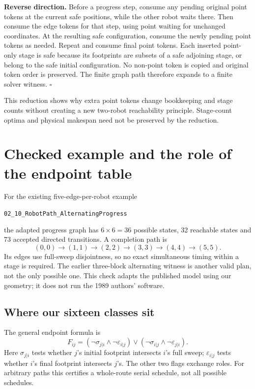 \documentclass[11pt,a4paper]{article}
\begin{document}
\textbf{Reverse direction.} Before a progress step, consume any pending original
point tokens at the current safe positions, while the other robot waits there.
Then consume the edge tokens for that step, using point waiting for unchanged
coordinates. At the resulting safe configuration, consume the newly pending
point tokens as needed. Repeat and consume final point tokens. Each inserted
point-only stage is safe because its footprints are subsets of a safe adjoining
stage, or belong to the safe initial configuration. No non-point token is copied
and original token order is preserved. The finite graph path therefore expands
to a finite solver witness. $\square$

This reduction shows why extra point tokens change bookkeeping and stage counts
without creating a new two-robot reachability principle. Stage-count optima and
physical makespan need not be preserved by the reduction.

\clearpage
\section{Checked example and the role of the endpoint table}
For the existing five-edge-per-robot example
\begin{center}\small\texttt{02\_10\_RobotPath\_AlternatingProgress}\end{center}
the adapted progress graph has
$6\times6=36$ possible states, 32 reachable states and 73 accepted directed
transitions. A completion path is
\begin{equation}
(0,0)\to(1,1)\to(2,2)\to(3,3)\to(4,4)\to(5,5).
\end{equation}
Its edges use full-sweep disjointness, so no exact simultaneous timing within
a stage is required. The earlier three-block alternating witness is another
valid plan, not the only possible one. This check adapts the published model
using our geometry; it does not run the 1989 authors' software.

\subsection*{Where our sixteen classes sit}
The general endpoint formula is
\begin{equation}
F_{ij}=(\neg\sigma_{j|i}\land\neg\varepsilon_{i|j})
\lor(\neg\sigma_{i|j}\land\neg\varepsilon_{j|i}).
\end{equation}
Here $\sigma_{j|i}$ tests whether $j$'s initial footprint intersects $i$'s full
sweep; $\varepsilon_{i|j}$ tests whether $i$'s final footprint intersects $j$'s.
The other two flags exchange roles. For arbitrary paths this certifies a
whole-route serial schedule, not all possible schedules.
\end{document}
